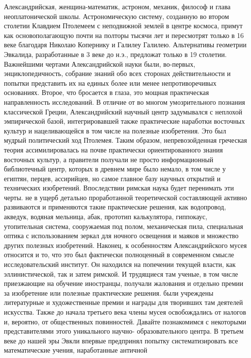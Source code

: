 Александрийская, женщина-математик, астроном, механик, философ и глава
неоплатонической школы. Астрономическую систему, созданную во втором столетии
Клавдием Птолемеем с неподвижной землей в центре космоса, примут как
основополагающую почти на полторы тысячи лет и пересмотрят только в 16 веке
благодаря Николаю Копернику и Галилеу Галилею. Альтернативы геометрии Эвкалида,
разработанные в 3 веке до н.э., предложат только в 19 столетии. Важнейшими
чертами Александрийской науки были, во-первых, энциклопедичность, собрание
знаний обо всех сторонах действительности и попытки представить их на единых
более или менее непротиворечивых основаниях. Второе, что бросается в глаза, это
мощная практическая направленность исследований. В отличие от во многом
умозрительного познания классической Греции, Александрийский научный центр
задумывался с неплохой эмпирической базой, интегрировавшей также практические
наработки восточных культур и нацеливающейся в том числе на полезные
изобретения. Это был мудрый политический ход Птолемея. Таким образом,
непревозойденная греческая теория ассимилировалась на почве практически
ориентированного знания восточных культур, а правители получали не просто
информационный библиотечный центр, которых в древнем мире было немало, в том
числе у египтян, перцев, ассирийцев, но самое главное базу научных открытий и
технических изобретений. Впоследствии римская наука будет перенимать эти черты.
не в ущерб детально проработанной теоретической составляющей активно развиваются
и применяются такие практические решения, как водопровод, акведук, водяная
мельница, абак, прототип калькулятора, гиппокаус, утопительная система,
сооружаемая под полом, механическая пила, специальная оптика с использованием
зеркал для ночного освещения и маяков и множество других полезных изобретений.
Наконец, к особенностям Александрийского мусея относится и то, что это был
фактически полноценный в современном смысле исследовательский институт. Он
находился на попечении текущей власти, как эллинистической, так и затем римской.
И трудящиеся там ученые, в том числе приезжающие на обучение иностранцы,
получали жалования и отдельно премии за изобретение или полезные практические
решения. были учреждены литературные и художественные премии и награды для
творивших там деятелей искусства. Также до начала третьего века члены мусея
освобождались от налогов и, вероятно, от общественных повинностей. Давайте
познакомимся с некоторыми представителями этого уникального научно-
образовательного центра. В третьем веке до нашей эры Эвкли впервые предпринял
попытку систематизировать все математические учения, наработанные античной
